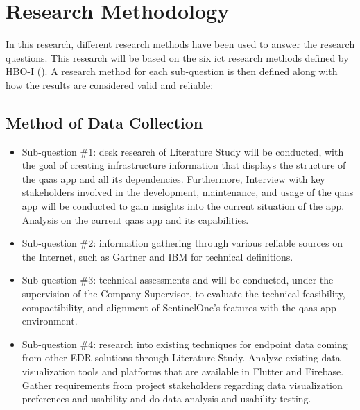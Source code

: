 \section{Research Methodology}
In this research, different research methods have been used to answer the research questions. This research
will be based on the six \acrshort{ict} research methods defined by HBO-I (\cite{ictresearchmethods}). A
research method for each sub-question is then defined along with how the results are considered valid and
reliable:
\subsection{Method of Data Collection}
\begin{itemize}[label=-]
      \item Sub-question \#1: desk research of Literature Study will be conducted, with the goal of creating
            infrastructure information that displays the structure of the \acrshort{qaas} app and all its
            dependencies. Furthermore, Interview with key stakeholders involved in the  development, maintenance,
            and usage of the \acrshort{qaas} app will be conducted to gain insights into the current situation
            of the app. Analysis on the current \acrshort{qaas} app and its capabilities.
      \item Sub-question \#2: information gathering through various reliable sources on the Internet, such as
            Gartner and IBM for technical definitions.
      \item Sub-question \#3: technical assessments and will be conducted, under the supervision of the Company
            Supervisor, to evaluate the technical feasibility, compactibility, and alignment of SentinelOne's
            features with the \acrshort{qaas} app environment.
      \item Sub-question \#4: research into existing techniques for endpoint data coming from
            other EDR solutions through Literature Study. Analyze existing data visualization tools and
            platforms that are available in Flutter and Firebase. Gather requirements from project stakeholders
            regarding data visualization preferences and usability and do data analysis and usability testing.

\end{itemize}
